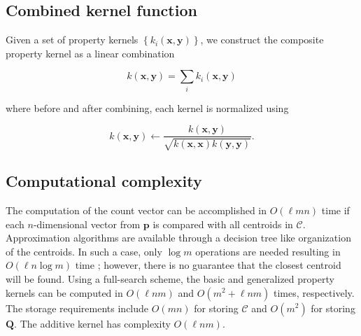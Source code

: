 \subsection{Combined kernel function}
\label{sec:combinedkernels}

Given a set of property kernels $\left\{ k_{i}(\mathbf{x},\mathbf{y})\right\} $, we construct the composite property kernel as a linear combination

\[
k(\mathbf{x}, \mathbf{y})=\sum_{i}k_{i}(\mathbf{x},\mathbf{y})
\]



\noindent where before and after combining, each kernel is normalized using

\[
k(\mathbf{x},\mathbf{y})\leftarrow\frac{k(\mathbf{x},\mathbf{y})}{\sqrt{k(\mathbf{x},\mathbf{x})k(\mathbf{y},\mathbf{y})}}.
\]


\subsection{Computational complexity}

The computation of the count vector can be accomplished in $O(\ell mn)$ time if each $n$-dimensional vector from $\mathbf{p}$ is compared with all centroids in $\mathcal{C}$. Approximation algorithms are available through a decision tree like organization of the centroids. In such a case, only $\log m$ operations are needed resulting in $O(\ell n\log m)$ time \citep{gersho1992vector}; however, there is no guarantee that the closest centroid will be found. Using a full-search scheme, the basic and generalized property kernels can be computed in $O(\ell nm)$ and $O(m^{2}+\ell nm)$ times, respectively. The storage requirements include $O(mn)$ for storing $\mathcal{C}$ and $O(m^{2})$ for storing \textbf{$\mathbf{Q}$}. The additive kernel has complexity $O(\ell nm)$.

